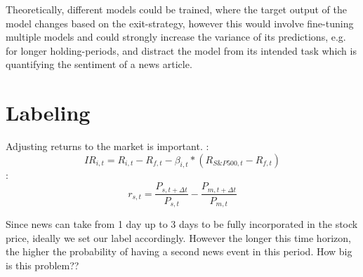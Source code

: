 \documentclass[12pt,a4paper]{article}
\begin{document}
	Theoretically, different models could be trained, where the target output of the model changes based on the exit-strategy, 
	however this would involve fine-tuning multiple models and could strongly increase the variance of its predictions, e.g. for longer holding-periods, 
	and distract the model from its intended task which is quantifying the sentiment of
	a news article.
	
	
	
	
	\section{Labeling}
	Adjusting returns to the market is important.
	\cite{salbrechter_financial_2021-1}:
	$$
	I R_{i, t}=R_{i, t}-R_{f, t}-\beta_{i, t} *\left(R_{S \& P 500, t}-R_{f, t}\right)
	$$
	\cite{chen_stock_2021}:
	$$
	r_{s, t}=\frac{P_{s, t+\Delta t}}{P_{s, t}}-\frac{P_{m, t+\Delta t}}{P_{m, t}}
	$$
	
	
	Since news can take from 1 day up to 3 days to be fully incorporated in the stock price, ideally we set our label accordingly.
	However the longer this time horizon, the higher the probability of having a second news event in this period.
	How big is this problem??
	
	
	
	
	
\end{document}
